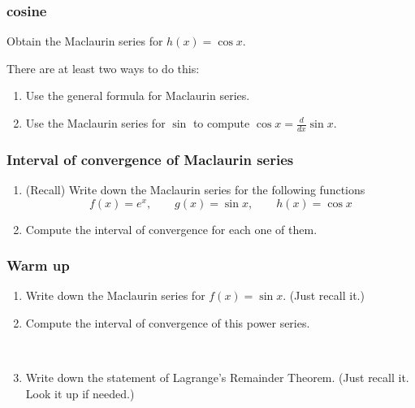 \begin{frame}[t]
	\frametitle{cosine}

	Obtain the Maclaurin series for $h(x) = \cos x$.

	There are at least two ways to do this:
	\vspace{.2cm}
	\begin{enumerate}
		\item Use the general formula for Maclaurin series.
			\vspace{.2cm}

		\item Use the Maclaurin series for $\sin$ to compute $\displaystyle \cos x =
			\frac{d}{dx}\sin x$.
	\end{enumerate}
\end{frame}

\begin{frame}[t]
	\frametitle{Interval of convergence of Maclaurin series}

	\begin{enumerate}
		\item (Recall) Write down the Maclaurin series for the following functions
			\[
				f(x) = e^{x}, \quad \quad g(x) = \sin x, \quad \quad h(x) = \cos x
			\]

		\item Compute the interval of convergence for each one of them.
	\end{enumerate}
\end{frame}

\begin{frame}[t]
	\frametitle{Warm up}

	\begin{enumerate}
		\item Write down the Maclaurin series for $\displaystyle f(x)=\sin x$. (Just
			recall it.)

		\item Compute the interval of convergence of this power series.

			\

		\item Write down the statement of Lagrange's Remainder Theorem. (Just recall
			it. Look it up if needed.)
	\end{enumerate}
\end{frame}

